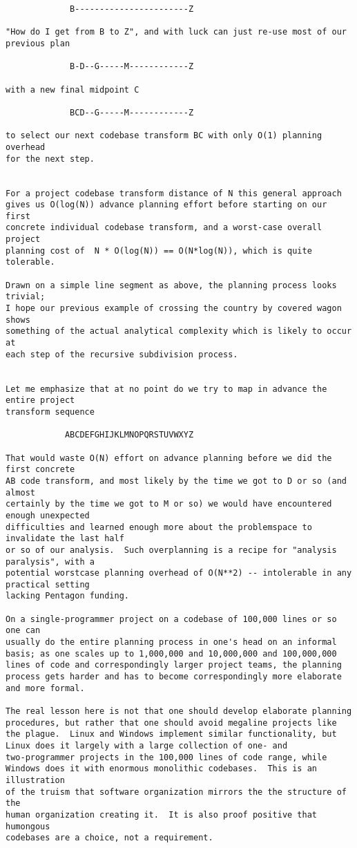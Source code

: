 \begin{verbatim}
             B-----------------------Z

"How do I get from B to Z", and with luck can just re-use most of our
previous plan

             B-D--G-----M------------Z

with a new final midpoint C

             BCD--G-----M------------Z

to select our next codebase transform BC with only O(1) planning overhead
for the next step.


For a project codebase transform distance of N this general approach
gives us O(log(N)) advance planning effort before starting on our first
concrete individual codebase transform, and a worst-case overall project
planning cost of  N * O(log(N)) == O(N*log(N)), which is quite tolerable.

Drawn on a simple line segment as above, the planning process looks trivial;
I hope our previous example of crossing the country by covered wagon shows
something of the actual analytical complexity which is likely to occur at
each step of the recursive subdivision process.


Let me emphasize that at no point do we try to map in advance the entire project
transform sequence

            ABCDEFGHIJKLMNOPQRSTUVWXYZ

That would waste O(N) effort on advance planning before we did the first concrete
AB code transform, and most likely by the time we got to D or so (and almost
certainly by the time we got to M or so) we would have encountered enough unexpected
difficulties and learned enough more about the problemspace to invalidate the last half
or so of our analysis.  Such overplanning is a recipe for "analysis paralysis", with a
potential worstcase planning overhead of O(N**2) -- intolerable in any practical setting
lacking Pentagon funding.

On a single-programmer project on a codebase of 100,000 lines or so one can
usually do the entire planning process in one's head on an informal
basis; as one scales up to 1,000,000 and 10,000,000 and 100,000,000
lines of code and correspondingly larger project teams, the planning
process gets harder and has to become correspondingly more elaborate
and more formal.

The real lesson here is not that one should develop elaborate planning
procedures, but rather that one should avoid megaline projects like
the plague.  Linux and Windows implement similar functionality, but
Linux does it largely with a large collection of one- and
two-programmer projects in the 100,000 lines of code range, while
Windows does it with enormous monolithic codebases.  This is an illustration
of the truism that software organization mirrors the the structure of the
human organization creating it.  It is also proof positive that humongous
codebases are a choice, not a requirement.


\end{verbatim}
